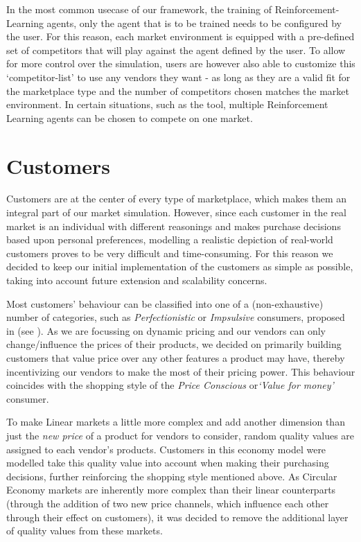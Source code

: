 In the most common usecase of our framework, the training of Reinforcement-Learning agents, only the agent that is to be trained needs to be configured by the user. For this reason, each market environment is equipped with a pre-defined set of competitors that will play against the agent defined by the user. To allow for more control over the simulation, users are however also able to customize this `competitor-list' to use any vendors they want - as long as they are a valid fit for the marketplace type and the number of competitors chosen matches the market environment. In certain situations, such as the  tool, multiple Reinforcement Learning agents can be chosen to compete on one market.

\section{Customers}\label{sec:Customers}

Customers are at the center of every type of marketplace, which makes them an integral part of our market simulation. However, since each customer in the real market is an individual with different reasonings and makes purchase decisions based upon personal preferences, modelling a realistic depiction of real-world customers proves to be very difficult and time-consuming. For this reason we decided to keep our initial implementation of the customers as simple as possible, taking into account future extension and scalability concerns.

Most customers' behaviour can be classified into one of a (non-exhaustive) number of categories, such as \emph{Perfectionistic} or \emph{Impsulsive} consumers, proposed in \cite{ShoppingStyles} (see ). As we are focussing on dynamic pricing and our vendors can only change/influence the prices of their products, we decided on primarily building customers that value price over any other features a product may have, thereby incentivizing our vendors to make the most of their pricing power. This behaviour coincides with the shopping style of the \emph{Price Conscious} or\emph{`Value for money'} consumer.

To make Linear markets a little more complex and add another dimension than just the \emph{new price} of a product for vendors to consider, random quality values are assigned to each vendor's products. Customers in this economy model were modelled take this quality value into account when making their purchasing decisions, further reinforcing the shopping style mentioned above. As Circular Economy markets are inherently more complex than their linear counterparts (through the addition of two new price channels, which influence each other through their effect on customers), it was decided to remove the additional layer of quality values from these markets.

